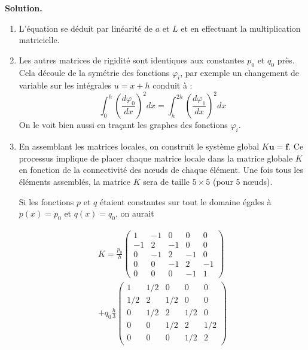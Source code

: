 \documentclass[11pt,a4paper]{report}
\newenvironment{solution}
{
    \vspace{0.5em}
    \begin{mdframed}[backgroundcolor=ThemeLight,leftmargin=0,rightmargin=0,skipabove=0.2em,skipbelow=0.2em]
    \textbf{Solution.}\\[0.5em]
}
{
    \end{mdframed}
    \vspace{0.5em}
}
\begin{document}
\begin{enumerate}[itemsep=0.5em]
{\begin{solution}
\begin{enumerate}
            \item L'équation se déduit par linéarité de $a$ et $L$ et en effectuant la multiplication matricielle. 

            \item Les autres matrices de rigidité sont identiques aux constantes $p_0$ et $q_0$ près. Cela découle de la symétrie des fonctions $\varphi_i$, par exemple un changement de variable sur les intégrales $u=x+h$ conduit à :
            \[
            \int_0^h \left( \frac{d\varphi_0}{dx} \right)^2 dx = \int_h^{2h} \left( \frac{d\varphi_1}{dx} \right)^2 dx 
            \]
            On le voit bien aussi en traçant les graphes des fonctions $\varphi_i$.
            \item En assemblant les matrices locales, on construit le système global $K \mathbf{u} = \mathbf{f}$. Ce processus implique de placer chaque matrice locale dans la matrice globale $K$ en fonction de la connectivité des nœuds de chaque élément. 
            Une fois tous les éléments assemblés, la matrice $K$ sera de taille $5 \times 5$ (pour 5 nœuds).

            Si les fonctions $p$ et $q$ étaient constantes sur tout le domaine égales à $p(x)=p_0$ et $q(x)=q_0$, on aurait

            \begin{multline*}
            K = \frac{p_0}{h}
            \begin{pmatrix}
                1 & -1 & 0 & 0 & 0\\
                -1 & 2 & -1 & 0 & 0\\
                0 & -1 & 2 & -1 & 0\\
                0 & 0 & -1 & 2 & -1\\
                0 & 0 & 0 & -1 & 1
            \end{pmatrix} \\ 
            + q_0 \frac{h}{3}
            \begin{pmatrix}
                1 & 1/2 & 0 & 0 & 0\\
                1/2 & 2 & 1/2 & 0 & 0\\
                0 & 1/2 & 2  & 1/2 & 0\\
                0 & 0 & 1/2 & 2 & 1/2\\
                0 & 0 & 0 & 1/2 & 2
            \end{pmatrix}
            \end{multline*}


\end{enumerate}
\end{solution}}
\end{enumerate}
\end{document}

